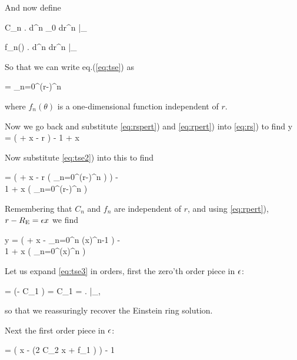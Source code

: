 And now define

\beq
\label{eq:Cndef}
C_n  \left. {d^n \phi_0 \over dr^n }\right|_{\re}
\eeq

\beq
\label{eq:fndef}
f_n(\theta)  \left. {d^n \psi \over dr^n }\right|_{\re}
\eeq

So that we can write  eq.(\ref{eq:tse}) as

\beq
\label{eq:tse2}
\phi  = \sum_{n=0}^\infty {} (r-\re)^n
\eeq

where $f_n(\theta)$ is a one-dimensional function independent of $r$.


Now we go back and substitute \eqref{eq:rspert}) and \eqref{eq:rpert}) into \eqref{eq:rs}) to find
\beq
\eps y = \left( \re + \eps x -  {\prtl  \phi \over \prtl r} \right)  - {1 \over \re + \eps x}  {\prtl  \phi \over \prtl \theta} \hat{\theta}
\eeq

Now substitute \eqref{eq:tse2}) into this to find

\bea
\eps {} = \left( \re + \eps x -  {\prtl \over \prtl r} \left( \sum_{n=0}^\infty {} (r-\re)^n  \right) \right)  - \\
{1 \over \re + \eps x}  {\prtl  \over \prtl \theta} \left( \sum_{n=0}^\infty {} (r-\re)^n  \right)  \hat{\theta} \nonumber
\eea

Remembering that $C_n$ and  $f_n$ are independent of $r$, and using \eqref{eq:rpert}), $r-R_{\mathrm{E}} = \epsilon x$ we find

\bea
\label{eq:tse3}
\eps y = \left( \re + \eps x -   \sum_{n=0}^\infty {} n (\eps x)^{n-1}  \right)  - \\
{1 \over \re + \eps x}  {\prtl  \over \prtl \theta} \left( \sum_{n=0}^\infty {} (\eps x)^n  \right)  \hat{\theta} \nonumber
\eea

Let us expand \eqref{eq:tse3} in orders, first the zero'th order piece in $\epsilon$:

 =  \left(\re - C_1 \right)  \rightarrow \re = C_1 = \left. \prtl \phi \over \prtl \theta \right|_{\re},
\eeq

so that we reassuringly recover the Einstein ring solution.

Next the first order piece in $\epsilon$:

\beq
\eps {} = \left( \eps x - (2 C_2 \eps x + \eps f_1 ) \right)  - {1 \over \re}  \hat{\theta}
\eeq

